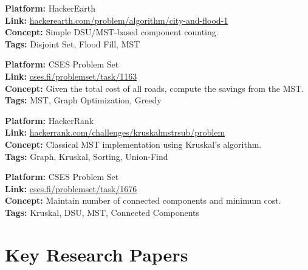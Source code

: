 \documentclass[a4paper,14pt]{extarticle}
\begin{document}
\begin{tcolorbox}[title=5. \textbf{City and Flood}]
\textbf{Platform:} HackerEarth \\
\textbf{Link:} \href{https://www.hackerearth.com/problem/algorithm/city-and-flood-1/}{hackerearth.com/problem/algorithm/city-and-flood-1} \\
\textbf{Concept:} Simple DSU/MST-based component counting. \\
\textbf{Tags:} Disjoint Set, Flood Fill, MST
\end{tcolorbox}

\begin{tcolorbox}[title=6. \textbf{Dark Roads}]
\textbf{Platform:} CSES Problem Set \\
\textbf{Link:} \href{https://cses.fi/problemset/task/1163}{cses.fi/problemset/task/1163} \\
\textbf{Concept:} Given the total cost of all roads, compute the savings from the MST. \\
\textbf{Tags:} MST, Graph Optimization, Greedy
\end{tcolorbox}

\begin{tcolorbox}[title=7. \textbf{Minimum Spanning Tree}]
\textbf{Platform:} HackerRank \\
\textbf{Link:} \href{https://www.hackerrank.com/challenges/kruskalmstrsub/problem}{hackerrank.com/challenges/kruskalmstrsub/problem} \\
\textbf{Concept:} Classical MST implementation using Kruskal’s algorithm. \\
\textbf{Tags:} Graph, Kruskal, Sorting, Union-Find
\end{tcolorbox}

\begin{tcolorbox}[title=8. \textbf{Road Construction}]
\textbf{Platform:} CSES Problem Set \\
\textbf{Link:} \href{https://cses.fi/problemset/task/1676}{cses.fi/problemset/task/1676} \\
\textbf{Concept:} Maintain number of connected components and minimum cost. \\
\textbf{Tags:} Kruskal, DSU, MST, Connected Components
\end{tcolorbox}

\newpage
\section{Key Research Papers}
\end{document}
